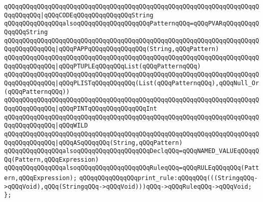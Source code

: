 \verb|qQQqqQQqqQQqqQQqqQQqqQQqqQQqqQQqqQQqqQQqqQQqqQQqqQQqqQQqqQQqqQQqqQQqqQQqqQQqqQQq|\verb#|qQQqCODEqQQqqQQqqQQqqQQqString#\newline
\newline
\verb|qQQqqQQqqQQqqQQqalsoqQQqqQQqqQQqqQQqqQQqPatternqQQq=qQQqPVARqQQqqQQqqQQqqQQqString|\newline
\verb|qQQqqQQqqQQqqQQqqQQqqQQqqQQqqQQqqQQqqQQqqQQqqQQqqQQqqQQqqQQqqQQqqQQqqQQqqQQqqQQqqQQq|\verb#|qQQqPAPPqQQqqQQqqQQqqQQq(String,qQQqPattern)#\newline
\verb|qQQqqQQqqQQqqQQqqQQqqQQqqQQqqQQqqQQqqQQqqQQqqQQqqQQqqQQqqQQqqQQqqQQqqQQqqQQqqQQqqQQq|\verb#|qQQqPTUPLEqQQqqQQqList(qQQqPatternqQQq)#\newline
\verb|qQQqqQQqqQQqqQQqqQQqqQQqqQQqqQQqqQQqqQQqqQQqqQQqqQQqqQQqqQQqqQQqqQQqqQQqqQQqqQQqqQQq|\verb#|qQQqPLISTqQQqqQQqqQQq(List(qQQqPatternqQQq),qQQqNull_Or(qQQqPatternqQQq))#\newline
\verb|qQQqqQQqqQQqqQQqqQQqqQQqqQQqqQQqqQQqqQQqqQQqqQQqqQQqqQQqqQQqqQQqqQQqqQQqqQQqqQQqqQQq|\verb#|qQQqPINTqQQqqQQqqQQqqQQqInt#\newline
\verb|qQQqqQQqqQQqqQQqqQQqqQQqqQQqqQQqqQQqqQQqqQQqqQQqqQQqqQQqqQQqqQQqqQQqqQQqqQQqqQQqqQQq|\verb#|qQQqWILD#\newline
\verb|qQQqqQQqqQQqqQQqqQQqqQQqqQQqqQQqqQQqqQQqqQQqqQQqqQQqqQQqqQQqqQQqqQQqqQQqqQQqqQQqqQQq|\verb#|qQQqASqQQqqQQq(String,qQQqPattern)#\newline
\newline
\verb|qQQqqQQqqQQqqQQqalsoqQQqqQQqqQQqqQQqqQQqDeclqQQq=qQQqNAMED_VALUEqQQqqQQq(Pattern,qQQqExpression)|\newline
\newline
\verb|qQQqqQQqqQQqqQQqalsoqQQqqQQqqQQqqQQqqQQqRuleqQQq=qQQqRULEqQQqqQQq(Pattern,qQQqExpression);|\newline
\newline
\verb|qQQqqQQqqQQqqQQqprint_rule:qQQqqQQq(((StringqQQq->qQQqVoid),qQQq(StringqQQq->qQQqVoid)))qQQq->qQQqRuleqQQq->qQQqVoid;|\newline
\verb|};|\newline

